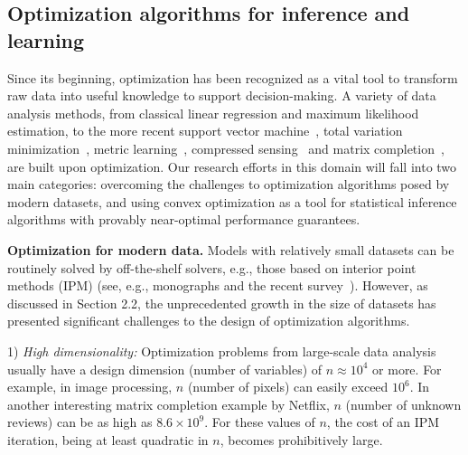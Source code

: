 \documentclass[12pt]{article}
\begin{document}

\vspace*{-1.5em}
\subsection{Optimization algorithms for inference and learning}
\label{sec:sub-randomization}


Since its beginning, optimization has been recognized as a vital tool to transform raw data into
useful knowledge to support decision-making. A variety of
data analysis methods, from classical linear regression and
maximum likelihood estimation, to the more recent support vector machine~\cite{Vap95,Vap98,VaLe63-1},
total variation minimization~\cite{RuOsFa92-1}, metric learning~\cite{Xing02distancemetric},
compressed sensing~\cite{CanRomTao06-1,Donoho06-1} and
matrix completion~\cite{CaRe08-1,CaTao09-1,ReFaPa07-1}, are built upon optimization.
Our research efforts in this domain will fall into two main categories: overcoming the challenges to optimization algorithms posed by modern datasets, and using convex optimization as a tool for statistical inference algorithms with provably near-optimal performance guarantees.

\medskip

\noindent
{\bf Optimization for modern data.}
Models with relatively small datasets  can be routinely
solved by off-the-shelf solvers, e.g., those based on interior point methods
(IPM) (see, e.g., monographs \cite{BenNem00,BoGhFeBa94,BoydVand04,NeNe94,Renegar01,RooSTerVi97,
SaVaWo00,Vanderbei07,Wri97,Ye97} and the recent survey~\cite{NemTod08-1}).
However, as discussed in Section 2.2, the unprecedented growth in the size of datasets has
presented significant challenges to the design of optimization algorithms.

1) {\it High dimensionality:} Optimization problems from large-scale data analysis usually have
a design dimension (number of variables) of $n \approx 10^4$ or more. For example,
in image processing, $n$ (number of pixels) can easily
exceed $10^6$. In another interesting matrix completion example by Netflix, $n$
(number of unknown reviews) can be as high as $8.6 \times 10^9$.
For these values of $n$, the cost of an IPM iteration,
being at least quadratic in $n$, becomes prohibitively large.
\end{document}
